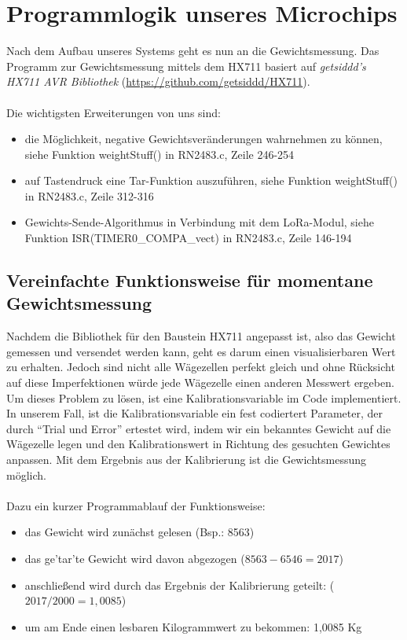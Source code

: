 \section{Programmlogik unseres Microchips}
Nach dem Aufbau unseres Systems geht es nun an die Gewichtsmessung. Das Programm zur Gewichtsmessung mittels dem HX711 basiert auf \textit{getsiddd's HX711 AVR Bibliothek} (\url{https://github.com/getsiddd/HX711}).\\ 
\\
Die wichtigsten Erweiterungen von uns sind:
\begin{itemize}
    \item die Möglichkeit, negative Gewichtsveränderungen wahrnehmen zu können, siehe Funktion weightStuff() in RN2483.c, Zeile 246-254
    \item auf Tastendruck eine Tar-Funktion auszuführen, siehe Funktion weightStuff() in RN2483.c, Zeile 312-316
    \item Gewichts-Sende-Algorithmus in Verbindung mit dem LoRa-Modul, siehe Funktion ISR(TIMER0\_COMPA\_vect) in RN2483.c, Zeile 146-194
\end{itemize}
\subsection{Vereinfachte Funktionsweise für momentane Gewichtsmessung}
\noindent
Nachdem die Bibliothek für den Baustein HX711 angepasst ist, also das Gewicht gemessen und versendet werden kann, geht es darum einen visualisierbaren Wert zu erhalten. Jedoch sind nicht alle Wägezellen perfekt gleich und ohne Rücksicht auf diese Imperfektionen würde jede Wägezelle einen anderen Messwert ergeben. 
Um dieses Problem zu lösen, ist eine Kalibrationsvariable im Code implementiert. In unserem Fall, ist die Kalibrationsvariable ein fest codiertert Parameter, der durch ``Trial und Error'' ertestet wird, indem wir ein bekanntes Gewicht auf die Wägezelle legen und den Kalibrationswert in Richtung des gesuchten Gewichtes anpassen. Mit dem Ergebnis aus der Kalibrierung ist die Gewichtsmessung möglich.\\
\\
Dazu ein kurzer Programmablauf der Funktionsweise:
\begin{itemize}
    \item das Gewicht wird zunächst gelesen (Bsp.: 8563)
    \item das ge'tar'te Gewicht wird davon abgezogen ($8563 - 6546 = 2017$)
    \item anschließend wird durch das Ergebnis der Kalibrierung geteilt: ($2017 / 2000 = 1,0085$)
    \item um am Ende einen lesbaren Kilogrammwert zu bekommen: 1,0085 Kg
\end{itemize}
